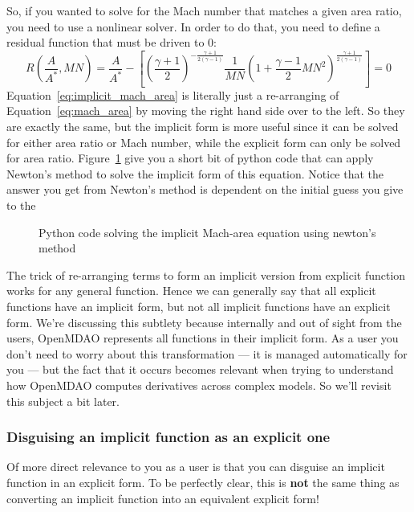 \documentclass[conf]{new-aiaa}
\begin{document}
    So, if you wanted to solve for the Mach number that matches a given area ratio, you need to use a nonlinear solver. 
    In order to do that, you need to define a residual function that must be driven to 0: 
    \begin{equation}
        R(\frac{A}{A^*}, MN) = \frac{A}{A^*} - \left[ \left(\frac{\gamma+1}{2}\right)^{-\frac{\gamma+1}{2(\gamma-1)}} 
                        \frac{1}{MN} 
                        \left( 1 + \frac{\gamma-1}{2}MN^2 \right)^{\frac{\gamma+1}{2(\gamma-1)}}\right] = 0
                        \label{eq:implicit_mach_area}
    \end{equation}
    Equation~\eqref{eq:implicit_mach_area} is literally just a re-arranging of Equation~\eqref{eq:mach_area} by moving the right hand side over to the left. 
    So they are exactly the same, but the implicit form is more useful since it can be solved for either area ratio or Mach number, while the explicit form can only be solved for area ratio. 
    Figure~\ref{fig:mach-area-implicit} give you a short bit of python code that can apply Newton's method to solve the implicit form of this equation. 
    Notice that the answer you get from Newton's method is dependent on the initial guess you give to the
    \begin{figure}[H]
        \centering
        
        \caption{Python code solving the implicit Mach-area equation using newton's method}
        \label{fig:mach-area-implicit}
    \end{figure}

    The trick of re-arranging terms to form an implicit version from explicit function works for any general function.
    Hence we can generally say that all explicit functions have an implicit form, but not all implicit functions have an explicit form. 
    We're discussing this subtlety because internally and out of sight from the users, OpenMDAO represents all functions in their implicit form. 
    As a user you don't need to worry about this transformation --- it is managed automatically for you --- but the fact that it occurs becomes relevant when trying to understand how OpenMDAO computes derivatives across complex models.  
    So we'll revisit this subject a bit later. 


    \subsubsection{Disguising an implicit function as an explicit one}
    Of more direct relevance to you as a user is that you can disguise an implicit function in an explicit form. 
    To be perfectly clear, this is \textbf{not} the same thing as converting an implicit function into an equivalent explicit form! 
\end{document}
